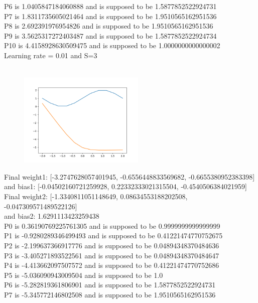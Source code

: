 \documentclass{article}
\begin{document}
P6 is 1.0405847184060888 and is supposed to be 1.5877852522924731\\
P7 is 1.8311735605021464 and is supposed to be 1.9510565162951536\\
P8 is 2.692391976954826 and is supposed to be 1.9510565162951536\\
P9 is 3.5625317272403487 and is supposed to be 1.5877852522924734\\
P10 is 4.4158928630509475 and is supposed to be 1.0000000000000002\\
Learning rate = 0.01 and S=3\\~\\
\begin{figure}[htp]
    \centering
    \includegraphics[width=6cm]{photos/1_01.png}
    \label{fig:2}
\end{figure}
Final weight1: [-3.2747628057401945, -0.6556448833569682, -0.6655380952383398]\\ and bias1: [-0.04502160721259928, 0.22332333021315504, -0.4540506384021959]\\
Final weight2: [-1.3340811051148649, 0.08634553188202508, -0.047309571489522126]\\ and bias2: 1.6291113423259438\\
P0 is 0.36190769225761305 and is supposed to be 0.9999999999999999\\
P1 is -0.9280289346499493 and is supposed to be 0.41221474770752675\\
P2 is -2.199637366917776 and is supposed to be 0.04894348370484636\\
P3 is -3.405271893522561 and is supposed to be 0.04894348370484647\\
P4 is -4.413662097507572 and is supposed to be 0.41221474770752686\\
P5 is -5.036090943009504 and is supposed to be 1.0\\
P6 is -5.282819361806901 and is supposed to be 1.5877852522924731\\
P7 is -5.345772146802508 and is supposed to be 1.9510565162951536\\
\end{document}
